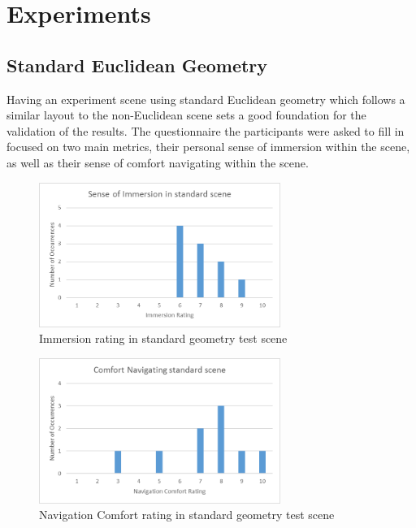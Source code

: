 
	\section{Experiments}
	\label{exp:exp}

		\subsection{Standard Euclidean Geometry}
		\label{exp:exp:standard}

			Having an experiment scene using standard Euclidean geometry which follows a similar layout to the non-Euclidean scene sets a good foundation for the validation of the results. %
			The questionnaire the participants were asked to fill in focused on two main metrics, their personal sense of immersion within the scene, as well as their sense of comfort navigating within the scene.



			\begin{figure}[H]
				\includegraphics[width=0.7\textwidth]{Images/Standard_Immersion}
				\centering
				\caption{Immersion rating in standard geometry test scene}
				\label{exp:fig:standard_immersion}
			\end{figure}

			\begin{figure}[H]
				\includegraphics[width=0.7\textwidth]{Images/Standard_Comfort}
				\centering
				\caption{Navigation Comfort rating in standard geometry test scene}
				\label{exp:fig:standard_comfort}
			\end{figure}

